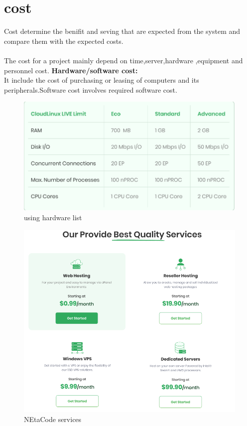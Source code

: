 \documentclass[a4paper,12pt]{report}
\begin{document}
	\section{cost}
	Cost determine the benifit and seving that are expected from the system and compare them with the expected costs.\\
	\\The cost for a project mainly depend on time,server,hardware ,equipment and personnel cost.
	\subitem \textbf{Hardware/software cost:\\}It include the cost of purchasing or leasing of computers and its peripherals.Software cost involves required software cost.
	\newpage
	\begin{figure}[h]
	\centering
	\includegraphics[width=0.7\linewidth]{7_2}
	\caption{using hardware list}
	\label{fig:72}
	\end{figure}
	\begin{figure}[h]
	\centering
	\includegraphics[width=0.8\linewidth]{8_4}
	\caption{NEtaCode services}
	\label{fig:84}
	\end{figure}
\end{document}
